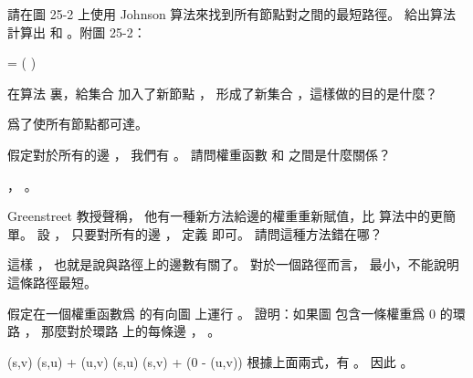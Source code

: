 \startsection[
  title={Johnson’s algorithm for sparse graphs},
]

\startEXERCISE
請在圖 25-2 上使用 Johnson 算法來找到所有節點對之間的最短路徑。
給出算法計算出  和 \m{\hat{\omega}}。附圖 25-2：

\externalfigure[output/e25_3_1-1]
\stopEXERCISE

\startANSWER
{}

{\startformula
\hat{\omega} = \left(\startmatrix
\NC \infty\NC \infty\NC \infty\NC \infty{}\NC \infty \NR
{}\NC \infty\NC \infty{}\NC \infty\NC \infty \NR
\NC \infty{}\NC \infty\NC \infty\NC \infty{} \NR
{}\NC \infty\NC \infty\NC \infty{}\NC \infty \NR
\NC \infty{}\NC \infty\NC \infty\NC \infty\NC \infty \NR
\NC \infty{}\NC \infty\NC \infty\NC \infty \NR
\stopmatrix\right)
\stopformula}{}
\stopcombination
\stopANSWER

\startEXERCISE
在算法  裏，給集合  加入了新節點 ，
形成了新集合 ，這樣做的目的是什麼？
\stopEXERCISE

\startANSWER
爲了使所有節點都可達。
\stopANSWER

\startEXERCISE
假定對於所有的邊 ，
我們有 。
請問權重函數 \m{\omega} 和 \m{\hat{\omega}} 之間是什麼關係？
\stopEXERCISE

\startANSWER
{}， \m{\omega=\hat{\omega}}。
\stopANSWER

\startEXERCISE
Greenstreet 教授聲稱，
他有一種新方法給邊的權重重新賦值，比  算法中的更簡單。
設 ，
只要對所有的邊 ，
定義  即可。
請問這種方法錯在哪？
\stopEXERCISE

\startANSWER
這樣 ，
也就是說與路徑上的邊數有關了。
對於一個路徑而言， \m{\omega^*} 最小，不能說明這條路徑最短。
\stopANSWER

\startEXERCISE
假定在一個權重函數爲 \m{\omega} 的有向圖  上運行 。
證明：如果圖  包含一條權重爲 0 的環路 ，
那麼對於環路  上的每條邊 ， 。
\stopEXERCISE

\startANSWER
\startformula\startmathalignment
\NC \delta(s,v) \le \NC \delta(s,u) + \omega(u,v) \NR
\NC \delta(s,u) \le \NC \delta(s,v) + (0 - \omega(u,v)) \NR
\stopmathalignment\stopformula
根據上面兩式，有 。
因此 。
\stopANSWER

